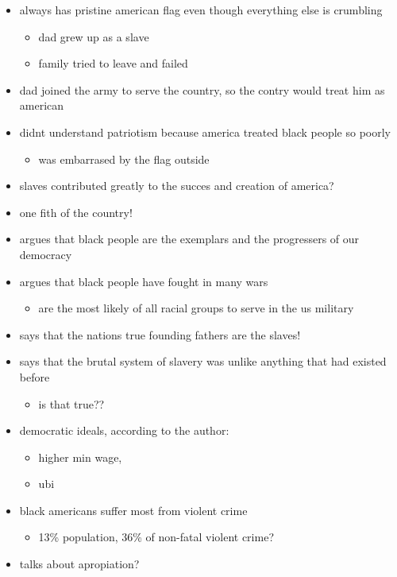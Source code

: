 \documentclass[letterpaper]{article}
\begin{document}
\begin{itemize}
\item always has pristine american flag even though everything else is
crumbling

\begin{itemize}
\item dad grew up as a slave
\item family tried to leave and failed
\end{itemize}

\item dad joined the army to serve the country, so the contry would treat
him as american

\item didnt understand patriotism because america treated black people so
poorly

\begin{itemize}
\item was embarrased by the flag outside
\end{itemize}

\item slaves contributed greatly to the succes and creation of america?

\item one fith of the country!

\item argues that black people are the exemplars and the progressers of our
democracy

\item argues that black people have fought in many wars

\begin{itemize}
\item are the most likely of all racial groups to serve in the us military
\end{itemize}

\item says that the nations true founding fathers are the slaves!

\item says that the brutal system of slavery was unlike anything that had
existed before

\begin{itemize}
\item is that true??
\end{itemize}

\item democratic ideals, according to the author:

\begin{itemize}
\item higher min wage,
\item ubi
\end{itemize}

\item black americans suffer most from violent crime

\begin{itemize}
\item 13\% population, 36\% of non-fatal violent crime?
\end{itemize}

\item talks about apropiation?
\end{itemize}
\end{document}
